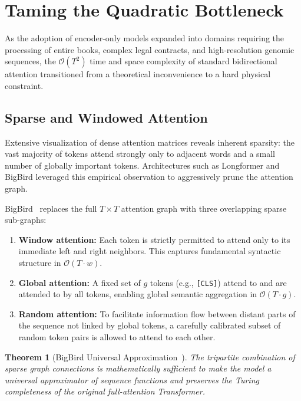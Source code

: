 \documentclass[11pt]{article}
\newtheorem{theorem}{Theorem}[section]
\begin{document}
\section{Taming the Quadratic Bottleneck}
\label{sec:taming}

As the adoption of encoder-only models expanded into domains requiring the processing of entire books, complex legal contracts, and high-resolution genomic sequences, the $\mathcal{O}(T^2)$ time and space complexity of standard bidirectional attention transitioned from a theoretical inconvenience to a hard physical constraint.

\subsection{Sparse and Windowed Attention}

Extensive visualization of dense attention matrices reveals inherent sparsity: the vast majority of tokens attend strongly only to adjacent words and a small number of globally important tokens. Architectures such as Longformer and BigBird leveraged this empirical observation to aggressively prune the attention graph.

BigBird~\cite{zaheer2020big} replaces the full $T \times T$ attention graph with three overlapping sparse sub-graphs:

\begin{enumerate}[label=(\roman*)]
  \item \textbf{Window attention:} Each token is strictly permitted to attend only to its immediate left and right neighbors. This captures fundamental syntactic structure in $\mathcal{O}(T \cdot w)$.
  \item \textbf{Global attention:} A fixed set of $g$ tokens (e.g., \texttt{[CLS]}) attend to and are attended to by all tokens, enabling global semantic aggregation in $\mathcal{O}(T \cdot g)$.
  \item \textbf{Random attention:} To facilitate information flow between distant parts of the sequence not linked by global tokens, a carefully calibrated subset of random token pairs is allowed to attend to each other.
\end{enumerate}

\begin{theorem}[BigBird Universal Approximation~\cite{zaheer2020big}]
The tripartite combination of sparse graph connections is mathematically sufficient to make the model a universal approximator of sequence functions and preserves the Turing completeness of the original full-attention Transformer.
\end{theorem}
\end{document}
